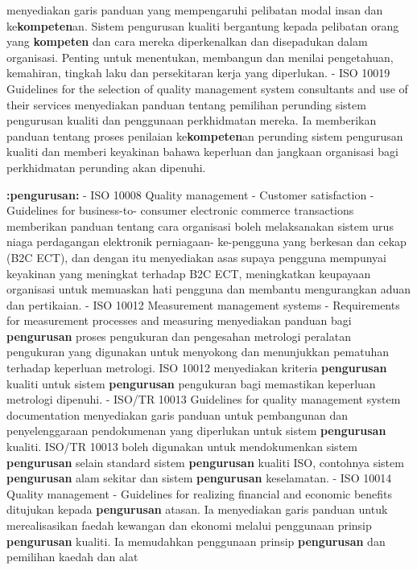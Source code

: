 \documentclass{article}
\begin{document}
 menyediakan garis panduan yang mempengaruhi pelibatan modal insan dan
 ke\textbf{kompeten}an. Sistem pengurusan kualiti bergantung kepada pelibatan orang yang
 \textbf{kompeten} dan cara mereka diperkenalkan dan disepadukan dalam organisasi. Penting
 untuk menentukan, membangun dan menilai pengetahuan, kemahiran, tingkah laku dan
 persekitaran kerja yang diperlukan.
- ISO 10019 Guidelines for the selection of quality management system consultants and
 use of their services menyediakan panduan tentang pemilihan perunding sistem
 pengurusan kualiti dan penggunaan perkhidmatan mereka. Ia memberikan panduan
 tentang proses penilaian ke\textbf{kompeten}an perunding sistem pengurusan kualiti dan
 memberi keyakinan bahawa keperluan dan jangkaan organisasi bagi perkhidmatan
 perunding akan dipenuhi.

\textbf{:pengurusan:} - ISO 10008 Quality management - Customer satisfaction - Guidelines for business-to-
 consumer electronic commerce transactions memberikan panduan tentang cara
 organisasi boleh melaksanakan sistem urus niaga perdagangan elektronik perniagaan-
 ke-pengguna yang berkesan dan cekap (B2C ECT), dan dengan itu menyediakan asas
 supaya pengguna mempunyai keyakinan yang meningkat terhadap B2C ECT,
 meningkatkan keupayaan organisasi untuk memuaskan hati pengguna dan membantu
 mengurangkan aduan dan pertikaian.
- ISO 10012 Measurement management systems - Requirements for measurement
 processes and measuring menyediakan panduan bagi \textbf{pengurusan} proses pengukuran
 dan pengesahan metrologi peralatan pengukuran yang digunakan untuk menyokong dan
 menunjukkan pematuhan terhadap keperluan metrologi. ISO 10012 menyediakan kriteria
 \textbf{pengurusan} kualiti untuk sistem \textbf{pengurusan} pengukuran bagi memastikan keperluan
 metrologi dipenuhi.
- ISO/TR 10013 Guidelines for quality management system documentation menyediakan
 garis panduan untuk pembangunan dan penyelenggaraan pendokumenan yang
 diperlukan untuk sistem \textbf{pengurusan} kualiti. ISO/TR 10013 boleh digunakan untuk
 mendokumenkan sistem \textbf{pengurusan} selain standard sistem \textbf{pengurusan} kualiti
 ISO, contohnya sistem \textbf{pengurusan} alam sekitar dan sistem \textbf{pengurusan} keselamatan.
- ISO 10014 Quality management - Guidelines for realizing financial and economic
 benefits ditujukan kepada \textbf{pengurusan} atasan. Ia menyediakan garis panduan untuk
 merealisasikan faedah kewangan dan ekonomi melalui penggunaan prinsip \textbf{pengurusan}
 kualiti. Ia memudahkan penggunaan prinsip \textbf{pengurusan} dan pemilihan kaedah dan alat
\end{document}
